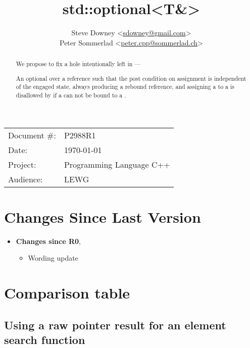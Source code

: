 \documentclass[a4paper,10pt,oneside,openany,final,article]{memoir}
\begin{document}
\title{std::optional<T\&>}
\author{
  Steve Downey \small<\href{mailto:sdowney@gmail.com}{sdowney@gmail.com}> \\
  Peter Sommerlad \small<\href{mailto:peter.cpp@sommerlad.ch}{peter.cpp@sommerlad.ch}> \\
}
\date{} %
\maketitle

\begin{flushright}
  \begin{tabular}{ll}
    Document \#: & P2988R1 \\
    Date: & \today \\
    Project: & Programming Language C++ \\
    Audience: & LEWG
  \end{tabular}
\end{flushright}

\begin{abstract}
  We propose to fix a hole intentionally left in  ---

  An optional over a reference such that the post condition on assignment is independent of the engaged state, always producing a rebound reference, and assigning a  to a  is disallowed by  if a  can not be bound to a .
\end{abstract}

\tableofcontents*

\chapter*{Changes Since Last Version}

\begin{itemize}
\item \textbf{Changes since R0},
  \begin{itemize}
  \item Wording update
  \end{itemize}
\end{itemize}

\chapter{Comparison table}
\section{Using a raw pointer result for an element search function}
\end{document}
